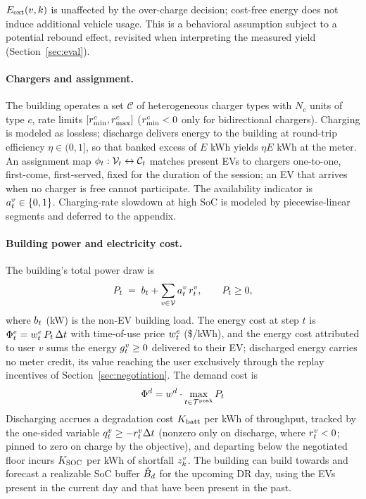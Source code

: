 \begin{assumption}\label{as:exo}
$E_{\mathrm{ext}}(v,k)$ is unaffected by the over-charge decision; cost-free energy does not induce additional vehicle usage. This is a behavioral assumption subject to a potential rebound effect, revisited when interpreting the measured yield (Section~\ref{sec:eval}).
\end{assumption}


\paragraph{Chargers and assignment.} The building operates a set
$\mathcal{C}$ of heterogeneous charger types with $N_c$ units of type $c$, rate limits $[r_{\min}^{c}, r_{\max}^{c}]$ ($r_{\min}^{c} < 0$ only for bidirectional chargers). Charging is modeled as lossless; discharge delivers energy to the building at round-trip efficiency $\eta \in (0,1]$, so that banked excess of $E$ kWh yields $\eta E$ kWh at the meter. An assignment map $\phi_t : \mathcal{V}_t \leftrightarrow \mathcal{C}_t$ matches present EVs to chargers one-to-one, first-come, first-served, fixed for the duration of the session; an EV that arrives when no charger is free cannot participate. The availability indicator is $a_{t}^{v} \in \{0,1\}$. Charging-rate slowdown at high SoC is modeled by piecewise-linear segments and deferred to the appendix.




\paragraph{Building power and electricity cost.} The building's total
power draw is
\begin{equation}\label{eq:load}
P_{t} \;=\; b_{t} + \sum_{v \in \mathcal{V}} a_{t}^{v}\,r_{t}^{v},
\qquad P_{t} \ge 0,
\end{equation}
where $b_{t}$ (kW) is the non-EV building load. The energy cost at step $t$ is $\Phi^{e}_t = w_{t}^{e}\,P_{t}\,\Delta t$ with time-of-use price $w_{t}^{e}$ (\$/kWh), and the energy cost attributed to user $v$ sums the energy $g_{t}^{v} \ge 0$ delivered to their EV; discharged energy carries no meter credit, its value reaching the user exclusively through the replay incentives of Section~\ref{sec:negotiation}. The demand cost is
\begin{equation}\label{eq:peak}
\Phi^{d} = w^{d}{}\cdot \max_{t \in \mathcal{T}^{\mathrm{peak}}} P_{t}
\end{equation}
Discharging accrues a degradation cost $K_{\mathrm{batt}}$ per kWh of throughput, tracked by the one-sided variable $q_{t}^{v} \ge -r_{t}^{v}\Delta t$ (nonzero only on discharge, where $r_{t}^{v}<0$; pinned to zero on charge by the objective), and departing below the negotiated floor incurs $K_{\mathrm{SOC}}$ per kWh of shortfall $z_{k}^{v}$. The building can build towards and forecast a realizable SoC buffer $\hat{B}_{d}$ for the upcoming DR day, using the EVs present in the current day and that have been present in the past.


